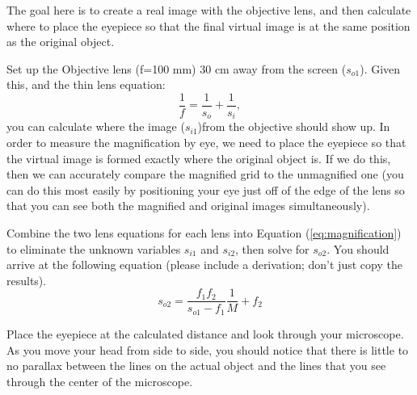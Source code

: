 The goal here is to create a real image with the objective lens, and then calculate where to place the eyepiece so that the final virtual image is at the same position as the original object.

Set up the Objective lens (f=100 mm) 30 cm away from the screen ($s_{o1}$). Given this, and the thin lens equation:
$$
\frac{1}{f}=\frac{1}{s_{o}}+\frac{1}{s_i},
$$
you can calculate where the image ($s_{i1}$)from the objective should show up. In order to measure the magnification by eye, we need to place the eyepiece so that the virtual image is formed exactly where the original object is. If we do this, then we can accurately compare the magnified grid to the unmagnified one (you can do this most easily by positioning your eye just off of the edge of the lens so that you can see both the magnified and original images simultaneously). \myskip

Combine the two lens equations for each lens into Equation (\ref{eq:magnification}) to eliminate the unknown variables $s_{i1}$ and $s_{i2}$, then solve for $s_{o2}$. You should arrive at the following equation (please include a derivation; don't just copy the results).
\begin{equation}
  s_{o2} = \frac{f_1 f_2}{s_{o1} - f_1} \frac{1}{M} + f_2
\end{equation}

Place the eyepiece at the calculated distance and look through your microscope. As you move your head from side to side, you should notice that there is little to no parallax between the lines on the actual object and the lines that you see through the center of the microscope.

